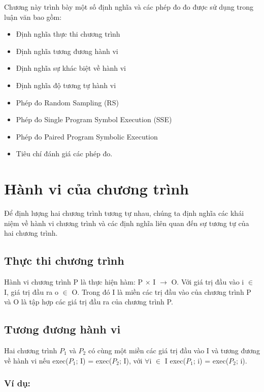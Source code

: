 Chương này trình bày một số định nghĩa và các phép đo đo được sử dụng trong luận văn bao gồm:
\begin{itemize}	
	\item Định nghĩa thực thi chương trình
	\item Định nghĩa tương đương hành vi
	\item Định nghĩa sự khác biệt về hành vi
	\item Định nghĩa độ tương tự hành vi
	\item Phép đo Random Sampling (RS)
	\item Phép đo Single Program Symbol Execution (SSE)
	\item Phép đo Paired Program Symbolic Execution
	\item Tiêu chí đánh giá các phép đo.
\end{itemize}

\section{Hành vi của chương trình}
Để định lượng hai chương trình tương tự nhau, chúng ta định nghĩa các khái niệm về hành vi chương trình và các định nghĩa liên quan đến sự tương tự của hai chương trình. 
	
\subsection{Thực thi chương trình}
\begin{definition}\label{def:progexe}
Hành vi chương trình P là thực hiện hàm: P $\times$ I $\rightarrow$ O. Với giá trị đầu vào i $\in$ I, giá trị đầu ra o $\in$ O. Trong đó I là miền các trị đầu vào của chương trình P và O là tập hợp các giá trị đầu ra của chương trình P.  
\end{definition}

\subsection{Tương đương hành vi}
\begin{definition}
  Hai chương trình $P_{1}$ và $P_{2}$ có cùng một miền các giá trị đầu
  vào I và tương đương về hành vi nếu exec($P_{1}$; I) = exec($P_{2}$;
  I), với $\forall$i $\in$ I exec($P_{1}$; i) = exec($P_{2}$; i).
\end{definition}
	
\subsubsection{Ví dụ:}


